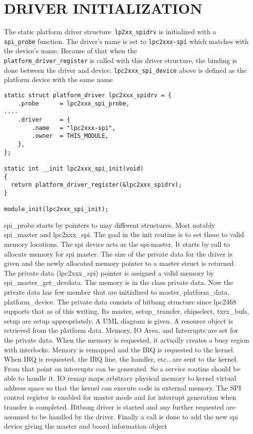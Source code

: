 \documentclass{book}
\begin{document}
\section{DRIVER INITIALIZATION}
The static platform driver structure\texttt{ lp2xx\_spidrv} is initialized with a \texttt{spi\_probe} function. The  driver's name is set to \texttt{lpc2xxx-spi} which matches with the device's name. Because of that when the \\
\texttt{platform\_driver\_register} is called with this driver structure, the binding is done between the driver and device. \texttt{lpc2xxx\_spi\_device} above is defined as the platform device with the same name 
\begin{Verbatim}[fontsize=\footnotesize]
static struct platform_driver lpc2xxx_spidrv = {
	.probe		= lpc2xxx_spi_probe,
....
	.driver		= {
		.name	= "lpc2xxx-spi",
		.owner	= THIS_MODULE,
	},
};

static int __init lpc2xxx_spi_init(void)
{
  return platform_driver_register(&lpc2xxx_spidrv);
}

module_init(lpc2xxx_spi_init);
\end{Verbatim}

spi\_probe starts by pointers to may different structures. Most notably spi\_master and lpc2xxx\_spi. The goal in the init routine is to set these to valid memory locations. The spi device acts as the spi-master. It starts by call to allocate memory for spi master. The size of the private data for the driver is given and the newly allocated memory pointer to a master struct is returned. The private data (lpc2xxx\_spi) pointer is assigned a valid memory by spi\_master\_get\_devdata. The memory is in the class private data. Now the private data has few member that are initialized to master, platform\_data, platform\_device. The private data consists of bitbang structure since lpc2468 supports that as of this writing. Its master, setup\_transfer, chipselect, txrx\_bufs, setup are setup appropriately. A UML diagram is given. A resource object is retrieved from the platform data. Memory, IO Area, and Interrupts are set for the private data. When the memory is requested, it actually creates a busy region with interlocks. Memory is remapped and the IRQ is requested to the kernel. When IRQ is requested, the IRQ line, the handler, etc.. are sent to the kernel. From that point on interrupts can be generated. So a service routine should be able to handle it. IO remap maps arbitrary physical memory to kernel virtual address space so that the kernel can execute code in external memory.  The SPI control register is enabled for master mode and for interrupt generation when transfer is completed. Bitbang driver is started and any further requested are assumed to be handled by the driver. Finally a call is done to add the new spi device giving the master and board information object  
\end{document}
